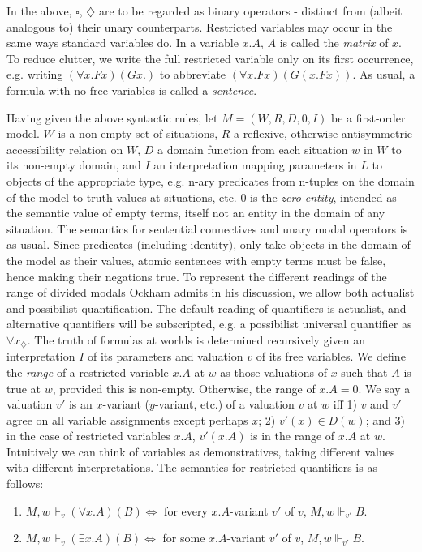 \documentclass[a4paper]{article}
\begin{document}
In the above, $\square$, $\diamondsuit$ are to be regarded as binary operators  - distinct from (albeit analogous to) their unary counterparts. Restricted variables may occur in the same ways standard variables do. In a variable $x.A$, $A$ is called the \textit{matrix} of $x$. To reduce clutter, we write the full restricted variable only on its first occurrence, e.g. writing $(\forall x.Fx)(Gx.)$ to abbreviate $(\forall x.Fx)(G(x.Fx))$. As usual, a formula with no free variables is called a \textit{sentence}. 

Having given the above syntactic rules, let $M = (W, R, D, 0, I)$ be a first-order model. $W$ is a non-empty set of situations, $R$ a reflexive, otherwise antisymmetric accessibility relation on $W$, $D$ a domain function from each situation $w$ in $W$ to its non-empty domain, and $I$ an interpretation mapping parameters in $L$ to objects of the appropriate type, e.g. n-ary predicates from n-tuples on the domain of the model to truth values at situations, etc. $0$ is the \textit{zero-entity}, intended as the semantic value of empty terms, itself not an entity in the domain of any situation. The semantics for sentential connectives and unary modal operators is as usual. Since predicates (including identity), only take objects in the domain of the model as their values, atomic sentences with empty terms must be false, hence making their negations true. To represent the different readings of the range of divided modals Ockham admits in his discussion, we allow both actualist and possibilist quantification. The default reading of quantifiers is actualist, and alternative quantifiers will be subscripted, e.g. a possibilist universal quantifier as $\forall x_{\diamondsuit}$. The truth of formulas at worlds is determined recursively given an interpretation $I$ of its parameters and valuation $v$ of its free variables. We define the \textit{range} of a restricted variable $x.A$ at $w$ as those valuations of $x$ such that $A$ is true at $w$, provided this is non-empty. Otherwise, the range of $x.A = 0$. We say a valuation $v'$ is an $x$-variant ($y$-variant, etc.) of a valuation $v$ at $w$ iff 1) $v$ and $v'$ agree on all variable assignments except perhaps $x$; 2) $v'(x) \in D(w)$; and 3) in the case of restricted variables $x.A$, $v'(x.A)$ is in the range of $x.A$ at $w$. Intuitively we can think of variables as demonstratives, taking different values with different interpretations. The semantics for restricted quantifiers is as follows: 
\begin{enumerate}
	\item $M, w \Vdash_{v} (\forall x.A)(B) \Leftrightarrow$ for every $x.A$-variant $v'$ of $v$, $M, w \Vdash_{v'} B$.
	\item $M, w \Vdash_{v} (\exists x.A)(B) \Leftrightarrow$ for some $x.A$-variant $v'$ of $v$, $M, w \Vdash_{v'} B$.
\end{enumerate}
\end{document}
